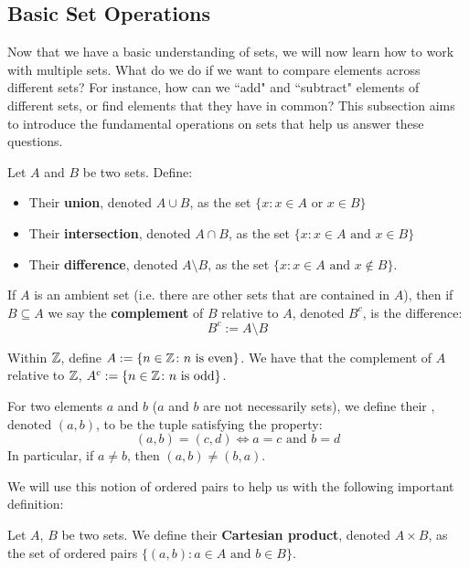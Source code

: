 \subsection{Basic Set Operations}

Now that we have a basic understanding of sets, we will now learn how to work with multiple sets. What do we do if we want to compare elements across different sets? For instance, how can we ``add" and ``subtract" elements of different sets, or find elements that they have in common? This subsection aims to introduce the fundamental operations on sets that help us answer these questions.

\begin{defbox}
   Let $A$ and $B$ be two sets. Define:
   \begin{itemize}
      \item Their \textbf{union}, denoted $A \cup B$, as the set $\{x \colon x \in A \text{ or } x \in B\}$
      \item Their \textbf{intersection}, denoted $A \cap B$, as the set $\{x \colon x \in A \text{ and } x \in B\}$
      \item Their \textbf{difference}, denoted $A \setminus B$, as the set $\{x \colon x \in A \text{ and } x \notin B\}$.
   \end{itemize}
\end{defbox}

If $A$ is an ambient set (i.e. there are other sets that are contained in $A$), then if $B \subseteq A$ we say the \textbf{complement} of $B$ relative to $A$, denoted $B^c$, is the difference:
\[ B^c := A \setminus B \]

\begin{example}
   Within $\mathbb{Z}$, define $A := \{n \in \mathbb{Z} \colon n \text{ is even}\}$. We have that the complement of $A$ relative to $\mathbb{Z}$, $A^c := \{n \in \mathbb{Z} \colon n \text{ is odd}\}$. 
\end{example}

\begin{defbox}
   For two elements $a$ and $b$ ($a$ and $b$ are not necessarily sets), we define their , denoted $(a,b)$, to be the tuple satisfying the property:
   \[ (a,b)=(c,d) \iff a=c \text{ and } b=d \]
In particular, if \(a\neq b\), then \((a,b)\neq(b,a)\).
\end{defbox}

We will use this notion of ordered pairs to help us with the following important definition:

\begin{defbox}
   Let $A$, $B$ be two sets. We define their \textbf{Cartesian product}, denoted $A \times B$, as the set of ordered pairs $\{(a,b) \colon a \in A \text{ and } b \in B\}$.
\end{defbox}

